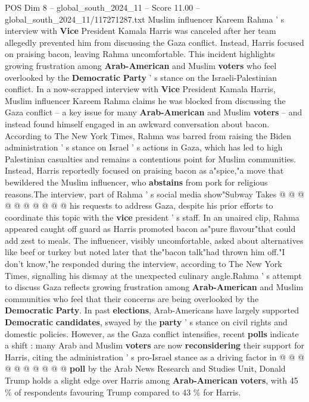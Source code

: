 \begin{textsample}{POS Dim 8 – global\_south\_2024\_11 – Score 11.00 – global\_south\_2024\_11/117271287.txt}  \label{ex:f8_pos_144}
Muslim influencer Kareem Rahma ' s interview with \textbf{Vice} President Kamala Harris was canceled after her team allegedly prevented him from discussing the Gaza conflict.
Instead, Harris focused on praising bacon, leaving Rahma uncomfortable.
This incident highlights growing frustration among \textbf{Arab-American} and Muslim \textbf{voters} who feel overlooked by the \textbf{Democratic} \textbf{Party} ' s stance on the Israeli-Palestinian conflict.
In a now-scrapped interview with \textbf{Vice} President Kamala Harris, Muslim influencer Kareem Rahma claims he was blocked from discussing the Gaza conflict -- a key issue for many \textbf{Arab-American} and Muslim \textbf{voters} -- and instead found himself engaged in an awkward conversation about bacon.
According to The New York Times, Rahma was barred from raising the Biden administration ' s stance on Israel ' s actions in Gaza, which has led to high Palestinian casualties and remains a contentious point for Muslim communities.
Instead, Harris reportedly focused on praising bacon as a"spice,"a move that bewildered the Muslim influencer, who \textbf{abstains} from pork for religious reasons.The interview, part of Rahma ' s social media show"Subway Takes @ @ @ @ @ @ @ @ @ @ his requests to address Gaza, despite his prior efforts to coordinate this topic with the \textbf{vice} president ' s staff.
In an unaired clip, Rahma appeared caught off guard as Harris promoted bacon as"pure flavour"that could add zest to meals.
The influencer, visibly uncomfortable, asked about alternatives like beef or turkey but noted later that the"bacon talk"had thrown him off."I don't know,"he responded during the interview, according to The New York Times, signalling his dismay at the unexpected culinary angle.Rahma ' s attempt to discuss Gaza reflects growing frustration among \textbf{Arab-American} and Muslim communities who feel that their concerns are being overlooked by the \textbf{Democratic} \textbf{Party}.
In past \textbf{elections}, Arab-Americans have largely supported \textbf{Democratic} \textbf{candidates}, swayed by the \textbf{party} ' s stance on civil rights and domestic policies.
However, as the Gaza conflict intensifies, recent \textbf{polls} indicate a shift : many Arab and Muslim \textbf{voters} are now \textbf{reconsidering} their support for Harris, citing the administration ' s pro-Israel stance as a driving factor in @ @ @ @ @ @ @ @ @ @ \textbf{poll} by the Arab News Research and Studies Unit, Donald Trump holds a slight edge over Harris among \textbf{Arab-American} \textbf{voters}, with 45 \% of respondents favouring Trump compared to 43 \% for Harris.

\end{textsample}
